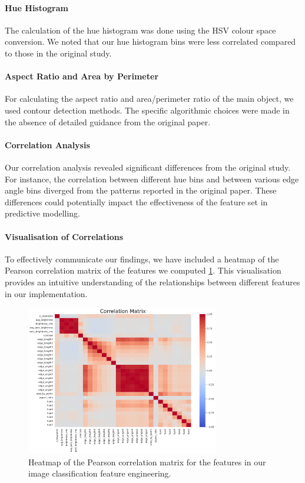 \paragraph{Hue Histogram}
The calculation of the hue histogram was done using the HSV colour space conversion. We noted that our hue histogram bins were less correlated compared to those in the original study.

\paragraph{Aspect Ratio and Area by Perimeter}
For calculating the aspect ratio and area/perimeter ratio of the main object, we used contour detection methods. The specific algorithmic choices were made in the absence of detailed guidance from the original paper.

\paragraph{Correlation Analysis}
Our correlation analysis revealed significant differences from the original study. For instance, the correlation between different hue bins and between various edge angle bins diverged from the patterns reported in the original paper. These differences could potentially impact the effectiveness of the feature set in predictive modelling.

\paragraph{Visualisation of Correlations}
To effectively communicate our findings, we have included a heatmap of the Pearson correlation matrix of the features we computed \ref{fig:correlation_matrix}. This visualisation provides an intuitive understanding of the relationships between different features in our implementation.

\begin{figure}[h]
  \centering
  \includegraphics[width=0.75\textwidth]{figures/cv_corr_matrix.pdf}
  \caption{Heatmap of the Pearson correlation matrix for the features in our image classification feature engineering.}
  \label{fig:correlation_matrix}
\end{figure}

